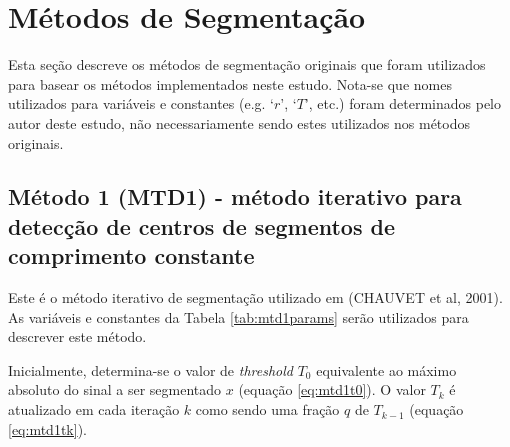 \documentclass[
	12pt,				%
	openright,			%
	oneside,
	a4paper,			%
	english,			%
	francais,			%
	spanish,			%
	brazil				%
	]{abntex2}
\begin{document}
\section{Métodos de Segmentação}

	Esta seção descreve os métodos de segmentação originais que foram utilizados para basear os métodos implementados neste estudo. Nota-se que nomes utilizados para variáveis e constantes (e.g. `$r$', `$T$', etc.) foram determinados pelo autor deste estudo, não necessariamente sendo estes utilizados nos métodos originais.
	
\subsection{Método 1 (MTD1) - método iterativo para detecção de centros de segmentos de comprimento constante}

	Este é o método iterativo de segmentação utilizado em (CHAUVET et al, 2001). As variáveis e constantes da Tabela \ref{tab:mtd1params} serão utilizados para descrever este método.
	
\begin{table}[htb]
\end{table}
	
	Inicialmente, determina-se o valor de \emph{threshold} $T_0$ equivalente ao máximo absoluto do sinal a ser segmentado $x$ (equação \ref{eq:mtd1t0}). O valor $T_k$ é atualizado em cada iteração $k$ como sendo uma fração $q$ de $T_{k-1}$ (equação \ref{eq:mtd1tk}).
	
\end{document}
